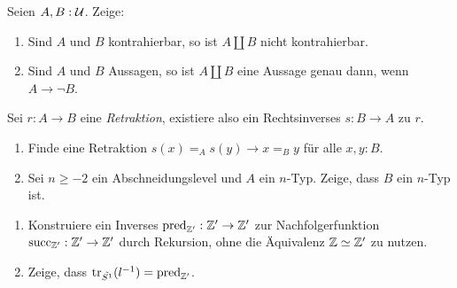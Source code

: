 \documentclass{uebung}
\begin{document}

\begin{exercise}
  Seien $A,B:\mathcal{U}$.
  Zeige:
  \begin{enumerate}
    \item Sind $A$ und $B$ kontrahierbar, so ist $A \amalg B$ nicht kontrahierbar.
    \item Sind $A$ und $B$ Aussagen, so ist $A \amalg B$ eine Aussage genau dann, wenn $A \to \neg B$.
  \end{enumerate}
\end{exercise}

\begin{exercise}
  Sei $r:A \to B$ eine \emph{Retraktion}, existiere also ein Rechtsinverses $s:B \to A$ zu $r$.
  \begin{enumerate}
    \item Finde eine Retraktion $s(x) =_A s(y) \to x=_B y$ für alle $x,y:B$.
    \item Sei $n\geq -2$ ein Abschneidungslevel und $A$ ein $n$-Typ.
      Zeige, dass $B$ ein $n$-Typ ist.
  \end{enumerate}
\end{exercise}

\begin{exercise}
  \begin{enumerate}
    \item Konstruiere ein Inverses $\mathrm{pred}_{\mathbb{Z}'}:\mathbb{Z}'\to\mathbb{Z}'$ zur Nachfolgerfunktion $\mathrm{succ}_{\mathbb{Z}'}:\mathbb{Z}'\to\mathbb{Z}'$ durch Rekursion, ohne die Äquivalenz $\mathbb{Z}\simeq\mathbb{Z}'$ zu nutzen.
    \item Zeige, dass $\mathrm{tr}_{\tilde{S^1}}(l^{-1})=\mathrm{pred}_{\mathbb{Z}'}$.
  \end{enumerate}
\end{exercise}
\end{document}
